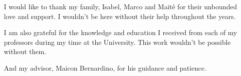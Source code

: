 \begin{agradecimentos}

I would like to thank my family, Isabel, Marco and Maitê for their unbounded love and support. I wouldn't  be here without their help throughout the years. 

I am also grateful for the knowledge and education I received from each of my professors during my time at the University. This work wouldn't be possible without them.

And my advisor, Maicon Bernardino, for his guidance and patience.

\end{agradecimentos}